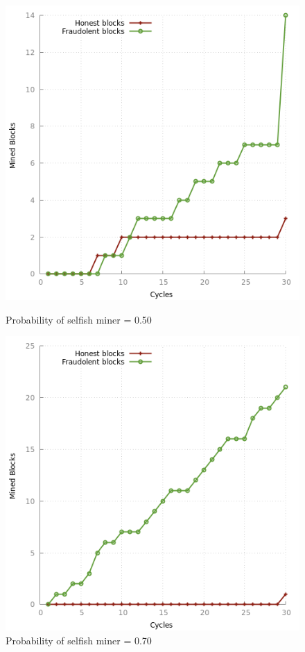 \documentclass{article}
\begin{document}
\begin{figure}[!htb]
  \includegraphics[width=\linewidth]{plots/blockchain_P0.50.png}
  \caption{Probability of selfish miner = 0.50}\label{fig:bk0.50}
\endminipage\hfill
{}
  \includegraphics[width=\linewidth]{plots/blockchain_P0.70}
  \caption{Probability of selfish miner = 0.70}\label{fig:bk0.70}
\endminipage\hfill
\end{figure}
\end{document}
